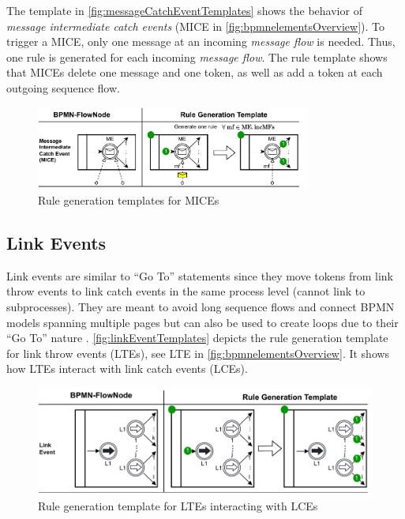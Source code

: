 \documentclass{lmcs} %
\begin{document}
The template in \autoref{fig:messageCatchEventTemplates} shows the behavior of \textit{message intermediate catch events} (\textsf{MICE} in \autoref{fig:bpmnelementsOverview}).
To trigger a MICE, only one message at an incoming \textit{message flow} is needed.
Thus, one rule is generated for each incoming \textit{message flow}.
The rule template shows that MICEs delete one message and one token, as well as add a token at each outgoing sequence flow.

\begin{figure}[ht]
    \centering
    \includegraphics[width=0.8\textwidth]{images/mice_template.pdf}
    \caption{Rule generation templates for MICEs}
    \label{fig:messageCatchEventTemplates}
\end{figure}


\subsection{Link Events} \label{subsec:signalEvents}
Link events are similar to \enquote{Go To} statements since they move tokens from link throw events to link catch events in the same process level (cannot link to subprocesses).
They are meant to avoid long sequence flows and connect BPMN models spanning multiple pages but can also be used to create loops due to their \enquote{Go To} nature \cite{objectmanagementgroupBusinessProcessModel2013}.
\autoref{fig:linkEventTemplates} depicts the rule generation template for link throw events (LTEs), see \textsf{LTE} in \autoref{fig:bpmnelementsOverview}.
It shows how LTEs interact with link catch events (LCEs).

\begin{figure}[ht]
    \centering
    \includegraphics[width=1\textwidth]{images/linkEvent_template.pdf}
    \caption{Rule generation template for LTEs interacting with LCEs}
    \label{fig:linkEventTemplates}
\end{figure}
\end{document}
